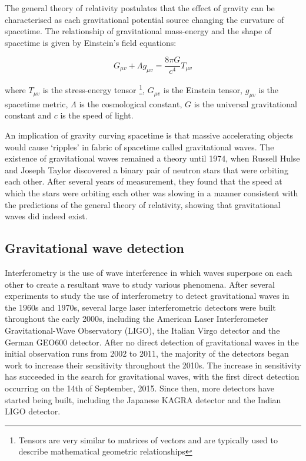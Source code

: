 \documentclass{article}
\begin{document}
The general theory of relativity postulates that the effect of gravity can be characterised as each
gravitational potential source changing the curvature of spacetime. The relationship of
gravitational mass-energy and the shape of spacetime is given by Einstein's field equations:

\begin{equation}
    G_{\mu{}v} + \Lambda{}g_{\mu{}v} = \dfrac{8\pi{}G}{c^4}T_{\mu{}v}
\end{equation}

where \(T_{\mu{}v}\) is the stress-energy tensor \footnote{Tensors are very similar to matrices of
vectors and are typically used to describe mathematical geometric relationships}, \(G_{\mu{}v}\) is
the Einstein tensor, \(g_{\mu{}v}\) is the spacetime metric, \(\Lambda\) is the cosmological
constant, \(G\) is the universal gravitational constant and \(c\) is the speed of light.

An implication of gravity curving spacetime is that massive accelerating objects would cause
`ripples' in fabric of spacetime called gravitational waves. The existence of gravitational waves
remained a theory until 1974, when Russell Hulse and Joseph Taylor discovered a binary pair of
neutron stars that were orbiting each other. After several years of measurement, they found that
the speed at which the stars were orbiting each other was slowing in a manner consistent with the
predictions of the general theory of relativity, showing that gravitational waves did indeed exist.

\subsection{Gravitational wave detection}

Interferometry is the use of wave interference \textendash{} in which waves superpose on each other
to create a resultant wave \textendash{} to study various phenomena. After several experiments to
study the use of interferometry to detect gravitational waves in the 1960s and 1970s, several large
laser interferometric detectors were built throughout the early 2000s, including the American Laser
Interferometer Gravitational-Wave Observatory (LIGO), the Italian Virgo detector and the German
GEO600 detector. After no direct detection of gravitational waves in the initial observation runs
from 2002 to 2011, the majority of the detectors began work to increase their sensitivity throughout
the 2010s. The increase in sensitivity has succeeded in the search for gravitational waves, with the
first direct detection occurring on the 14th of September, 2015. Since then, more detectors have
started being built, including the Japanese KAGRA detector and the Indian LIGO detector.
\end{document}
